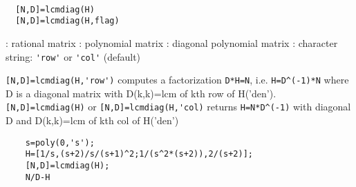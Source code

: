 
\begin{mandesc}
   \\ %
\end{mandesc}
\begin{calling_sequence}
\begin{verbatim}
  [N,D]=lcmdiag(H)  
  [N,D]=lcmdiag(H,flag)  
\end{verbatim}
\end{calling_sequence}
\begin{parameters}
  \begin{varlist}
    : rational matrix
    : polynomial matrix
    : diagonal polynomial matrix
    : character string: \verb!'row'! or \verb!'col'! (default)
  \end{varlist}
\end{parameters}
\begin{mandescription}
  \verb![N,D]=lcmdiag(H,'row')! computes a factorization \verb!D*H=N!,
  i.e.  \verb!H=D^(-1)*N!  where D is a diagonal matrix with D(k,k)=lcm of 
  kth row of H('den').\verb![N,D]=lcmdiag(H)! or \verb![N,D]=lcmdiag(H,'col)! returns
  \verb!H=N*D^(-1)! with diagonal D and D(k,k)=lcm of kth col of H('den')
\end{mandescription}
\begin{examples}
  \begin{Verbatim}
    s=poly(0,'s');
    H=[1/s,(s+2)/s/(s+1)^2;1/(s^2*(s+2)),2/(s+2)];
    [N,D]=lcmdiag(H);
    N/D-H
  \end{Verbatim}
\end{examples}
\begin{manseealso}
      
\end{manseealso}
